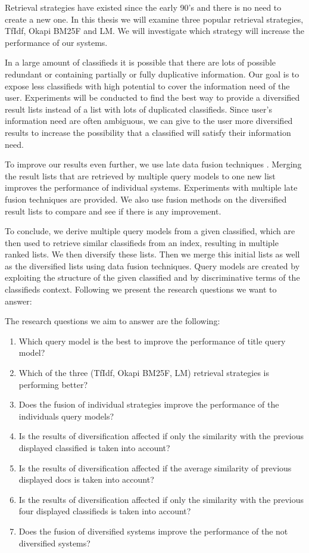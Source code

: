 Retrieval strategies have existed since the early 90's and there is no need to create a new one. In this thesis we will examine three popular retrieval strategies, TfIdf, Okapi BM25F and LM. We will investigate which strategy will increase the performance of our systems.

In a large amount of classifieds it is possible that there are lots of possible redundant or containing partially or fully duplicative information. Our goal is to expose less classifieds with high potential to cover the information need of the user. Experiments will be conducted to find the best way to provide a diversified result lists instead of a list with lots of duplicated classifieds. Since user's information need are often ambiguous, we can give to the user more diversified results to increase the possibility that a classified will satisfy their information need.

To improve our results even further, we use late data fusion techniques \cite{Belkin}. Merging the result lists that are retrieved by multiple query models to one new list improves the performance of individual systems. Experiments with multiple late fusion techniques are provided. We also use fusion methods on the diversified result lists to compare and see if there is any improvement.

To conclude, we derive multiple query models from a given classified, which are then used to retrieve similar classifieds from an index, resulting in multiple ranked lists. We then diversify these lists. Then we merge this initial lists as well as the diversified lists using data fusion techniques. Query models are created by exploiting the structure of the given classified and by discriminative terms of the classifieds context. Following we present the research questions we want to answer:

The research questions we aim to answer are the following:
\begin{enumerate}
\item Which query model is the best to improve the performance of title query model?
\item Which of the three (TfIdf, Okapi BM25F, LM) retrieval strategies is performing better?
\item Does the fusion of individual strategies improve the performance of the individuals query models?
\item Is the results of diversification affected if only the similarity with the previous displayed classified is taken into account?
\item Is the results of diversification affected if the average similarity of previous displayed docs is taken into account?
\item Is the results of diversification affected if only the similarity with the previous four displayed classifieds is taken into account?
\item Does the fusion of diversified systems improve the performance of the not diversified systems?
\end{enumerate}

